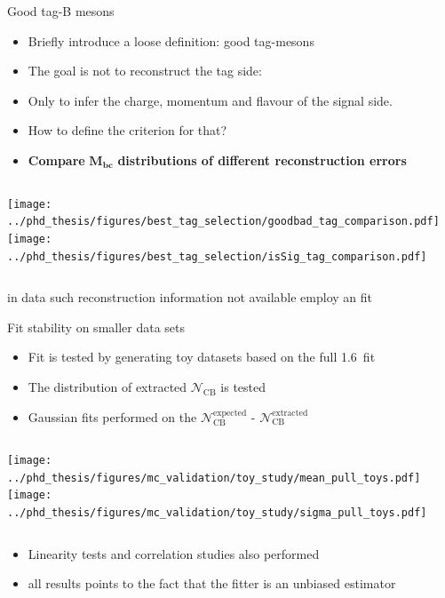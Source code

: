 \documentclass[xcolor=dvipsnames]{beamer}
\begin{document}
   \begin{frame}{Good tag-B mesons}
      \centering\scriptsize
      \begin{itemize}
         \item Briefly introduce a loose definition: good tag-\B mesons
         \item The goal is not to reconstruct the tag side:
         \item Only to infer the charge, momentum and flavour of the signal side.
         \item How to define the criterion for that?
         \item[\ra] \textbf{Compare} $\bm{M_{bc}}$ \textbf{distributions of different reconstruction errors}
      \end{itemize}
   
      \begin{columns}
         \centering
         \texttt{[image: ../phd\_thesis/figures/best\_tag\_selection/goodbad\_tag\_comparison.pdf]}
         \centering
         \texttt{[image: ../phd\_thesis/figures/best\_tag\_selection/isSig\_tag\_comparison.pdf]}
      \end{columns}
   
      \ra in data such reconstruction information not available
      \ra employ an \Mbc fit
   
   \end{frame}
   

\begin{frame}{Fit stability on smaller data sets}
   \scriptsize\centering
      \begin{itemize}
         \item Fit is tested by generating toy datasets based on the full 1.6~\invab fit
         \item The distribution of extracted $\mathcal{N}_{\mathrm{CB}}$ is tested
         \item Gaussian fits performed on the $\mathcal{N}_{\mathrm{CB}}^{\mathrm{expected}}$ - $\mathcal{N}_{\mathrm{CB}}^{\mathrm{extracted}}$
      \end{itemize}
   
   \begin{columns}
      \texttt{[image: ../phd\_thesis/figures/mc\_validation/toy\_study/mean\_pull\_toys.pdf]}
      \texttt{[image: ../phd\_thesis/figures/mc\_validation/toy\_study/sigma\_pull\_toys.pdf]}
   \end{columns}
   
   \begin{itemize}
      \item Linearity tests and correlation studies also performed
      \item[\ra] all results points to the fact that the fitter is an unbiased estimator
   \end{itemize}
   
   
   
   
   
   \end{frame}
\end{document}
